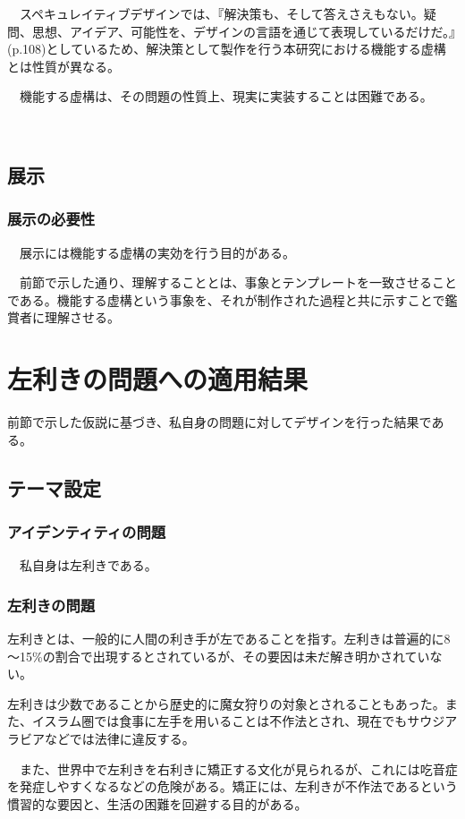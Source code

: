 \documentclass{jsarticle}
\begin{document}
　スペキュレイティブデザインでは、『解決策も、そして答えさえもない。疑問、思想、アイデア、可能性を、デザインの言語を通じて表現しているだけだ。』(p.108)としているため、解決策として製作を行う本研究における機能する虚構とは性質が異なる。

　機能する虚構は、その問題の性質上、現実に実装することは困難である。

　\newpage
\subsection{展示}
\subsubsection{展示の必要性}
　展示には機能する虚構の実効を行う目的がある。

　前節で示した通り、理解することとは、事象とテンプレートを一致させることである。機能する虚構という事象を、それが制作された過程と共に示すことで鑑賞者に理解させる。



\newpage
\section{左利きの問題への適用結果}

前節で示した仮説に基づき、私自身の問題に対してデザインを行った結果である。

\subsection{テーマ設定}
\subsubsection{アイデンティティの問題}

　私自身は左利きである。

\subsubsection{左利きの問題}
  左利きとは、一般的に人間の利き手が左であることを指す。左利きは普遍的に8～15\%の割合で出現する\cite{Hardyck}とされているが、その要因は未だ解き明かされていない。

  左利きは少数であることから歴史的に魔女狩りの対象とされることもあった。また、イスラム圏では食事に左手を用いることは不作法とされ\cite{kitaoka}、現在でもサウジアラビアなどでは法律に違反する。

　また、世界中で左利きを右利きに矯正する文化が見られるが、これには吃音症を発症しやすくなるなどの危険がある。矯正には、左利きが不作法であるという慣習的な要因と、生活の困難を回避する目的がある。
\end{document}
